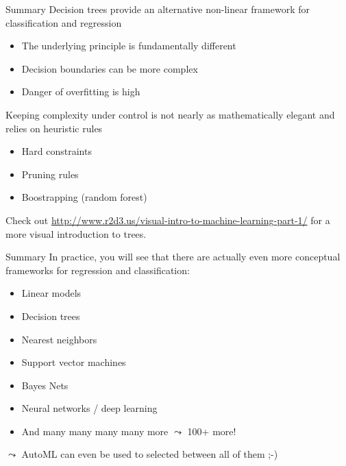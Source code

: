 \documentclass[aspectratio=169]{../latex_main/tntbeamer}  %
\begin{document}
	\begin{frame}{Summary}
	    Decision trees provide an alternative non-linear framework for classification and regression
	    \begin{itemize}
	        \item The underlying principle is fundamentally different
	        \item Decision boundaries can be more complex
	        \item Danger of overfitting is high
	    \end{itemize}
	    \bigskip
	    Keeping complexity under control is not nearly as mathematically elegant and relies on heuristic rules
	    \begin{itemize}
	        \item Hard constraints
	        \item Pruning rules
	        \item Boostrapping (random forest)
	    \end{itemize}
	    
	    Check out \url{http://www.r2d3.us/visual-intro-to-machine-learning-part-1/} for a more visual introduction to trees.
	    
	\end{frame}
	
	\begin{frame}{Summary}
	   In practice, you will see that there are actually even more conceptual frameworks for regression and classification:
	    \begin{itemize}
	        \item Linear models
	        \item Decision trees
	        \item Nearest neighbors
	        \item Support vector machines
	        \item Bayes Nets
            \item Neural networks / deep learning
	        \item And many many many many more $\leadsto$ 100+ more!
	    \end{itemize}
	    
	    \bigskip
	    
	    $\leadsto$ AutoML can even be used to selected between all of them ;-)
	\end{frame}
\end{document}
